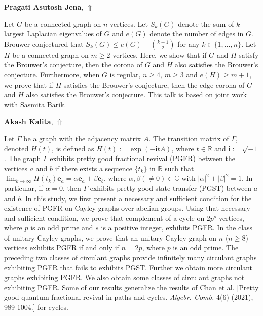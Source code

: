 \documentclass[ILAS2025-program.tex]{subfiles}
\begin{document}
\hypertarget{down0082}{}\begin{ilasabstract}
    
\textbf{Pragati Asutosh Jena},  \hfill \hyperlink{up0082}{$\Uparrow$}
    
    
\mtskip
    Let $G$ be a connected graph on $n$ vertices. Let $S_k(G)$ denote the sum of $k$ largest Laplacian eigenvalues of $G$ and $e(G)$ denote the number of edges in $G$. Brouwer conjectured that $S_k(G)\leq e(G)+\binom{k+1}{2}$ for any $k\in \{1,\ldots,n\}$. Let $H$ be a connected graph on $m\geq 2$ vertices. Here, we show that if $G$ and $H$ satisfy the Brouwer's conjecture, then the corona of $G$ and $H$ also satisfies the Brouwer's conjecture. Furthermore, when $G$ is regular, $n\geq 4$, $m\geq 3$ and $e(H)\geq m+1$, we prove that if $H$ satisfies the Brouwer's conjecture, then the edge corona of $G$ and $H$ also satisfies the Brouwer's conjecture. This talk is based on joint work with Sasmita Barik.
\end{ilasabstract}
    

\hypertarget{down0426}{}\begin{ilasabstract}
    
\textbf{Akash Kalita},  \hfill \hyperlink{up0426}{$\Uparrow$}
    
    
\mtskip
    Let $\Gamma$ be a graph with the adjacency matrix $A$. The transition matrix of $\Gamma$, denoted $H(t)$, is defined as $H(t) := \exp(-\textbf{i}tA)$, where $t \in \mathbb{R}$ and $\textbf{i} := \sqrt{-1}$. The graph $\Gamma$ exhibits pretty good fractional revival (PGFR) between the vertices $a$ and $b$ if there exists a sequence $\{t_k\}$ in $\mathbb{R}$ such that $\lim_{k\to\infty} H(t_k){\textbf{e}_{a}} = \alpha{\textbf{e}_{a}} + \beta{\textbf{e}_{b}}$, where $\alpha, \beta(\neq 0) \in \mathbb{C}$ with $|\alpha|^2 + |\beta|^2 = 1$. In particular, if $\alpha = 0$, then $\Gamma$ exhibits pretty good state transfer (PGST) between $a$ and $b$. In this study, we first present a necessary and sufficient condition for the existence of PGFR on Cayley graphs over abelian groups. Using that necessary and sufficient condition, we prove that complement of a cycle on $2 p^s$ vertices, where $p$ is an odd prime and $s$ is a positive integer, exhibits PGFR.  In the class of unitary Cayley graphs, we prove that an unitary Cayley graph on $n$ ($n \geq 8$) vertices exhibits PGFR if and only if $n = 2p$, where $p$ is an odd prime. The preceding two classes of circulant graphs provide infinitely many circulant graphs exhibiting PGFR that fails to exhibits PGST. Further we obtain more circulant graphs exhibiting PGFR. We also obtain some classes of circulant graphs not exhibiting PGFR. Some of our results generalize the results of Chan et al. [Pretty good quantum fractional revival in paths and cycles. \textit {Algebr. Comb.} 4(6) (2021), 989-1004.] for cycles.        

\end{ilasabstract}
    
\end{document}
